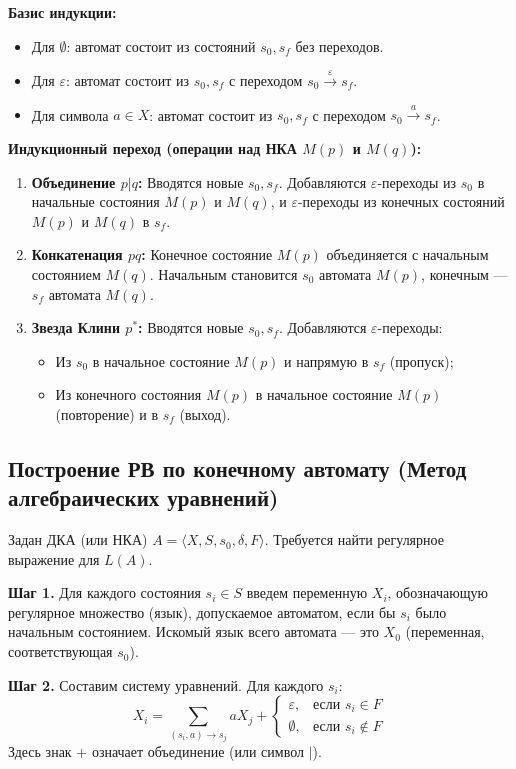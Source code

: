 \documentclass[12pt,a4paper]{article}
\theoremstyle{definition}
\theoremstyle{plain}
\theoremstyle{remark}
\begin{document}
\textbf{Базис индукции:}
\begin{itemize}
    \item Для $\emptyset$: автомат состоит из состояний $s_0, s_f$ без переходов.
    \item Для $\varepsilon$: автомат состоит из $s_0, s_f$ с переходом $s_0 \xrightarrow{\varepsilon} s_f$.
    \item Для символа $a \in X$: автомат состоит из $s_0, s_f$ с переходом $s_0 \xrightarrow{a} s_f$.
\end{itemize}

\textbf{Индукционный переход (операции над НКА $M(p)$ и $M(q)$):}
\begin{enumerate}
    \item \textbf{Объединение $p | q$:} Вводятся новые $s_0, s_f$. Добавляются $\varepsilon$-переходы из $s_0$ в начальные состояния $M(p)$ и $M(q)$, и $\varepsilon$-переходы из конечных состояний $M(p)$ и $M(q)$ в $s_f$.
    \item \textbf{Конкатенация $pq$:} Конечное состояние $M(p)$ объединяется с начальным состоянием $M(q)$. Начальным становится $s_0$ автомата $M(p)$, конечным — $s_f$ автомата $M(q)$.
    \item \textbf{Звезда Клини $p^*$:} Вводятся новые $s_0, s_f$. Добавляются $\varepsilon$-переходы:
    \begin{itemize}
        \item Из $s_0$ в начальное состояние $M(p)$ и напрямую в $s_f$ (пропуск);
        \item Из конечного состояния $M(p)$ в начальное состояние $M(p)$ (повторение) и в $s_f$ (выход).
    \end{itemize}
\end{enumerate}

\subsection{Построение РВ по конечному автомату (Метод алгебраических уравнений)}
Задан ДКА (или НКА) $A = \langle X, S, s_0, \delta, F \rangle$. Требуется найти регулярное выражение для $L(A)$.

\textbf{Шаг 1.} Для каждого состояния $s_i \in S$ введем переменную $X_i$, обозначающую регулярное множество (язык), допускаемое автоматом, если бы $s_i$ было начальным состоянием.
Искомый язык всего автомата — это $X_0$ (переменная, соответствующая $s_0$).

\textbf{Шаг 2.} Составим систему уравнений. Для каждого $s_i$:
$$ X_i = \sum_{(s_i, a) \to s_j} a X_j + \begin{cases}
\varepsilon, & \text{если } s_i \in F \\
\emptyset, & \text{если } s_i \notin F
\end{cases} $$
Здесь знак $+$ означает объединение (или символ $|$).
\end{document}
